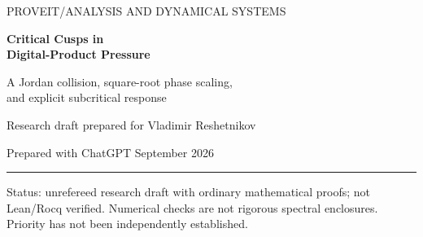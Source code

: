 \documentclass[11pt,a4paper]{article}
\numberwithin{equation}{section}
\theoremstyle{definition}
\theoremstyle{remark}
\begin{document}
\hypersetup{pageanchor=false}
\begin{titlepage}
\thispagestyle{empty}
\setlength{\parindent}{0pt}
{\small\sffamily\color{ink} PROVEIT\quad /\quad ANALYSIS AND DYNAMICAL SYSTEMS}\par
\vspace{17mm}
{\Huge\bfseries\color{ink} Critical Cusps in\\[3mm] Digital-Product Pressure\par}
\vspace{8mm}
{\Large A Jordan collision, square-root phase scaling,\\[2mm]
and explicit subcritical response\par}
\vspace{11mm}
{\large Research draft prepared for Vladimir Reshetnikov\par}
{Prepared with ChatGPT\quad\textbullet{} September 2026\par}
\vspace{8mm}\hrule\vspace{4mm}
\begin{abstract}
For digital masks in every integer base $b\ge2$, we determine the leading
phase singularity at the critical absolute-moment exponent $s=1$:
\[
 P_{b,1}(c)=\sqrt{2(b-1)\log b}\,|c|^{1/2}
            +O_{b,\eta}(|c|^{1-\eta}),\qquad 0<\eta<\tfrac12.
\]
For the binary potential $\psi_c(x)=\log\cos^2\pi(x-c)$ this is the
previously excluded pressure order $q=1/2$, since $s=2q$.
The square root comes from a genuine size-two Jordan block of the atomic
transfer operator. We construct the generalized eigenfunction explicitly
with the digamma function and prove an exponential remainder on every
$C^\alpha$, $0<\alpha<1$, by weighted quadrature rather than an assumed
Perron theorem for a singular potential.

The same reduction gives a uniform two-parameter law when
$s-1=u\sqrt{|c|}$ and an operator-norm finite-size crossover on the scale
$n\sqrt{|c|}$. Separately, for every fixed $1/2<s<1$, we prove the exact
subcritical cusp
\[
 P_{b,s}(c)=(1-s)\log b+
 (b-1)\pi s\tan(\pi s/2)|c|+o(|c|).
\]
Its coefficient follows from a universal singular-translation integral.
Together these results distinguish the critical square root, the
subcritical linear cusp, and the repository's supercritical fractional
response. Full proofs, numerical diagnostics, a proof-dependency audit,
and a further-research agenda are included.
\end{abstract}
\vfill
{\small\color{muted} Status: unrefereed research draft with ordinary mathematical proofs;
not Lean/Rocq verified. Numerical checks are not rigorous spectral enclosures.
Priority has not been independently established.}
\end{titlepage}
\hypersetup{pageanchor=true}
\end{document}
